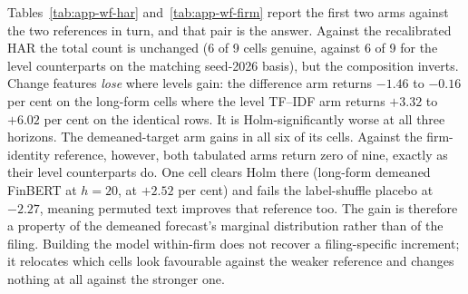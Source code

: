 Tables~\ref{tab:app-wf-har} and~\ref{tab:app-wf-firm} report the first two
arms against the two references in turn, and that pair is the answer. Against the
recalibrated HAR the total count is unchanged (6 of 9 cells genuine,
against 6 of 9 for the level counterparts on the matching seed-2026 basis),
but the composition inverts. Change features \emph{lose} where levels gain: the
difference arm returns $-1.46$ to $-0.16$ per cent on the long-form cells
where the level TF--IDF arm returns $+3.32$ to $+6.02$ per cent on the
identical rows. It is Holm-significantly worse at all three horizons. The
demeaned-target arm gains in all six of its cells. Against the
firm-identity reference, however, both tabulated arms return zero of nine,
exactly as
their level counterparts do. One cell clears Holm there (long-form
demeaned FinBERT at $h{=}20$, at $+2.52$ per cent) and fails the
label-shuffle placebo at $-2.27$, meaning permuted text improves that
reference too. The gain is therefore a property of the demeaned forecast's
marginal distribution rather than of the filing. Building the model
within-firm does not recover a filing-specific increment; it relocates
which cells look favourable against the weaker reference and changes
nothing at all against the stronger one.

